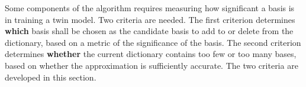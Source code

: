 
Some components of the algorithm requires measuring how significant a basis is
in training a twin model. Two criteria are needed. 
The first criterion determines \textbf{which} basis shall be chosen as the candidate basis 
to add to or delete from the dictionary, based on a metric of the significance of 
the basis.
The second criterion determines \textbf{whether} the current dictionary contains too few or
too many bases, based
on whether the approximation is sufficiently accurate.
The two criteria are developed in this section. \\



